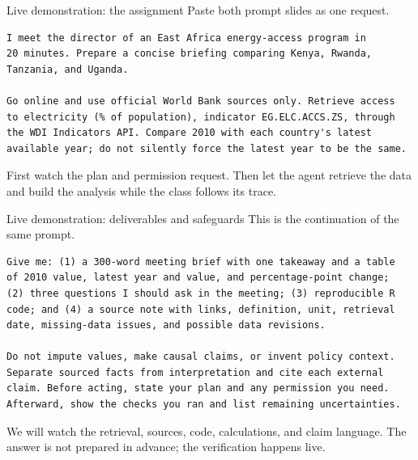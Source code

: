 \begin{frame}[fragile]{Live demonstration: the assignment}
  \alert{Paste both prompt slides as one request.}

\begin{lstlisting}
I meet the director of an East Africa energy-access program in
20 minutes. Prepare a concise briefing comparing Kenya, Rwanda,
Tanzania, and Uganda.

Go online and use official World Bank sources only. Retrieve access
to electricity (% of population), indicator EG.ELC.ACCS.ZS, through
the WDI Indicators API. Compare 2010 with each country's latest
available year; do not silently force the latest year to be the same.
\end{lstlisting}

  \vfill
  First watch the plan and permission request. Then let the agent retrieve the
  data and build the analysis while the class follows its trace.
\end{frame}

\begin{frame}[fragile]{Live demonstration: deliverables and safeguards}
  \alert{This is the continuation of the same prompt.}

\begin{lstlisting}
Give me: (1) a 300-word meeting brief with one takeaway and a table
of 2010 value, latest year and value, and percentage-point change;
(2) three questions I should ask in the meeting; (3) reproducible R
code; and (4) a source note with links, definition, unit, retrieval
date, missing-data issues, and possible data revisions.

Do not impute values, make causal claims, or invent policy context.
Separate sourced facts from interpretation and cite each external
claim. Before acting, state your plan and any permission you need.
Afterward, show the checks you ran and list remaining uncertainties.
\end{lstlisting}

  \vfill
  We will watch the retrieval, sources, code, calculations, and claim language.
  The answer is not prepared in advance; the verification happens live.
\end{frame}
